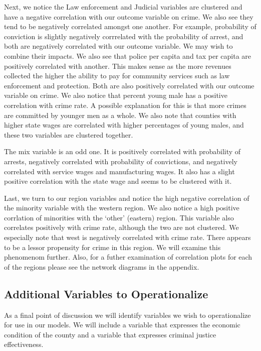 \documentclass[]{article}
\begin{document}
Next, we notice the Law enforcement and Judicial variables are clustered
and have a negative correlation with our outcome variable on crime. We
also see they tend to be negatively correlated amongst one another. For
example, probability of conviction is slightly negatively corrrelated
with the probability of arrest, and both are negatively correlated with
our outcome variable. We may wish to combine their impacts. We also see
that police per capita and tax per capita are positively correlated with
another. This makes sense as the more revenues collected the higher the
ability to pay for community services such as law enforcement and
protection. Both are also positively correlated with our outcome
variable on crime. We also notice that percent young male has a positive
correlation with crime rate. A possible explanation for this is that
more crimes are committed by younger men as a whole. We also note that
counties with higher state wages are correlated with higher percentages
of young males, and these two variables are clustered together.

The mix variable is an odd one. It is positively correlated with
probability of arrests, negatively correlated with probability of
convictions, and negatively correlated with service wages and
manufacturing wages. It also has a slight positive correlation with the
state wage and seems to be clustered with it.

Last, we turn to our region variables and notice the high negative
correlation of the minority variable with the western region. We also
notice a high positive corrlation of minorities with the `other'
(eastern) region. This variable also correlates positively with crime
rate, although the two are not clustered. We especially note that west
is negatively correlated with crime rate. There appears to be a lessor
propensity for crime in this region. We will examine this phenomenom
further. Also, for a futher examination of correlation plots for each of
the regions please see the network diagrams in the appendix.

\hypertarget{additional-variables-to-operationalize}{%
\subsection{Additional Variables to
Operationalize}\label{additional-variables-to-operationalize}}

As a final point of discussion we will identify variables we wish to
operationalize for use in our models. We will include a variable that
expresses the economic condition of the county and a variable that
expresses criminal justice effectiveness.
\end{document}
